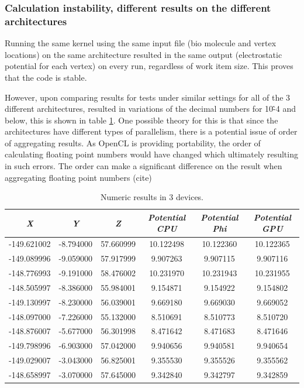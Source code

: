 \subsubsection{Calculation instability, different results on the 
              different architectures}
\par{Running the same kernel using the same input file 
    (bio molecule and vertex locations) on the same architecture resulted 
    in the same output (electrostatic potential for each vertex) on every run, 
    regardless of work item size. This proves that the code is stable.}

\par{However, upon comparing results for tests under similar settings for 
    all of the 3 different architectures, resulted in variations of the 
    decimal numbers for 10\^-4 and below, this is shown in table \ref{tab:n1}.
    One possible theory for this is that since the architectures have different 
    types of parallelism, there is a potential issue of order of aggregating 
    results. As OpenCL is providing portability, the order of calculating 
    floating point numbers would have changed which ultimately resulting in 
    such errors. The order can make a significant difference on the result 
    when aggregating floating point numbers ({\color{red}cite})}

\begin{table}[!h]
    \centering
    \begin{tabular}{| c | c | c | c | c | c |}
    \hline
    \emph{X} & \emph{Y} & \emph{Z} & \emph{Potential CPU} &
    \emph{Potential Phi} & \emph{Potential GPU} \\ \hline
    -149.621002&-8.794000&57.660999&10.122{\color{green}498}
        &10.122{\color{green}360}&10.122{\color{green}365}\\ \hline
    -149.089996&-9.059000&57.917999&9.907263&9.907115&9.907116\\ \hline
    -148.776993&-9.191000&58.476002&10.231970&10.231943&10.231955\\ \hline
    -148.505997&-8.386000&55.984001&9.154871&9.154922&9.154802\\ \hline
    -149.130997&-8.230000&56.039001&9.669180&9.669030&9.669052\\ \hline
    -148.097000&-7.226000&55.132000&8.510691&8.510773&8.510720\\ \hline
    -148.876007&-5.677000&56.301998&8.471642&8.471683&8.471646\\ \hline
    -149.798996&-6.903000&57.042000&9.940656&9.940581&9.940654\\ \hline
    -149.029007&-3.043000&56.825001&9.355530&9.355526&9.355562\\ \hline
    -148.658997&-3.070000&57.645000&9.342840&9.342797&9.342859\\ \hline
    \end{tabular}
    \caption{Numeric results in 3 devices.}
    \label{tab:n1}
\end{table}

